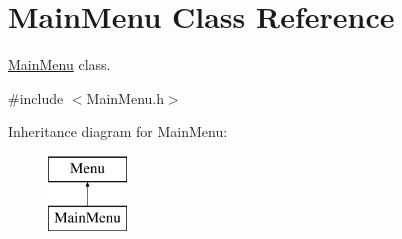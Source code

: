 \hypertarget{classMainMenu}{}\section{Main\+Menu Class Reference}
\label{classMainMenu}


\hyperlink{classMainMenu}{Main\+Menu} class.  




{\ttfamily \#include $<$Main\+Menu.\+h$>$}

Inheritance diagram for Main\+Menu\+:\begin{figure}[H]
\begin{center}
\leavevmode
\includegraphics[height=2.000000cm]{classMainMenu}
\end{center}
\end{figure}
